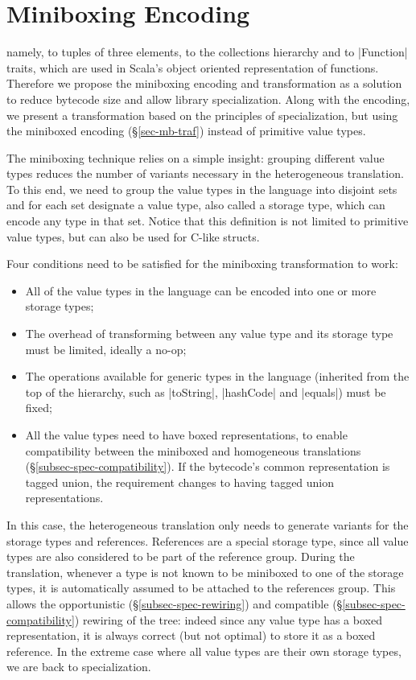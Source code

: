 \section{Miniboxing Encoding}
\label{sec-miniboxing}

 namely, to tuples of three elements, to the collections hierarchy and to |Function| traits, which are used in Scala's object oriented representation of functions. Therefore we propose the miniboxing encoding and transformation as a solution to reduce bytecode size and allow library specialization. Along with the encoding, we present a transformation based on the principles of specialization, but using the miniboxed encoding (\S\ref{sec-mb-traf}) instead of primitive value types. 

The miniboxing technique relies on a simple insight: grouping different value types reduces the number of variants necessary in the heterogeneous translation. To this end, we need to group the value types in the language into disjoint sets and for each set designate a value type, also called a storage type, which can encode any type in that set. Notice that this definition is not limited to primitive value types, but can also be used for C-like structs.

Four conditions need to be satisfied for the miniboxing transformation to work:
\begin{itemize}
  \item All of the value types in the language can be encoded into one or more storage types;
  \item The overhead of transforming between any value type and its storage type must be limited, ideally a no-op;
  \item The operations available for generic types in the language (inherited from the top of the hierarchy, such as |toString|, |hashCode| and |equals|) must be fixed;
  \item All the value types need to have boxed representations, to enable compatibility between the miniboxed and homogeneous translations (\S\ref{subsec-spec-compatibility}). If the bytecode's common representation is tagged union, the requirement changes to having tagged union representations. 
\end{itemize}

In this case, the heterogeneous translation only needs to generate variants for the storage types and references. References are a special storage type, since all value types are also considered to be part of the reference group. During the translation, whenever a type is not known to be miniboxed to one of the storage types, it is automatically assumed to be attached to the references group. This allows the opportunistic (\S\ref{subsec-spec-rewiring}) and compatible (\S\ref{subsec-spec-compatibility}) rewiring of the tree: indeed since any value type has a boxed representation, it is always correct (but not optimal) to store it as a boxed reference. In the extreme case where all value types are their own storage types, we are back to specialization.     


